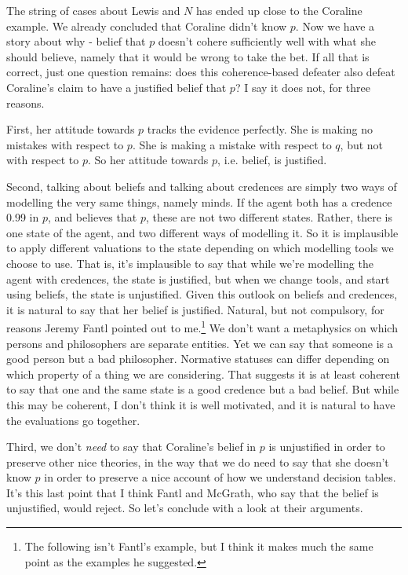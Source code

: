 \documentclass[11pt,oneside]{book}
\begin{document}
The string of cases about Lewis and $N$ has ended up close to the Coraline example. We already concluded that Coraline didn't know $p$. Now we have a story about why - belief that $p$ doesn't cohere sufficiently well with what she should believe, namely that it would be wrong to take the bet. If all that is correct, just one question remains: does this coherence-based defeater also defeat Coraline's claim to have a justified belief that $p$? I say it does not, for three reasons.

First, her attitude towards $p$ tracks the evidence perfectly. She is making no mistakes with respect to $p$. She is making a mistake with respect to $q$, but not with respect to $p$. So her attitude towards $p$, i.e. belief, is justified.

Second, talking about beliefs and talking about credences are simply two ways of modelling the very same things, namely minds. If the agent both has a credence 0.99 in $p$, and believes that $p$, these are not two different states. Rather, there is one state of the agent, and two different ways of modelling it. So it is implausible to apply different valuations to the state depending on which modelling tools we choose to use. That is, it's implausible to say that while we're modelling the agent with credences, the state is justified, but when we change tools, and start using beliefs, the state is unjustified. Given this outlook on beliefs and credences, it is natural to say that her belief is justified. Natural, but not compulsory, for reasons Jeremy Fantl pointed out to me.\footnote{The following isn't Fantl's example, but I think it makes much the same point as the examples he suggested.} We don't want a metaphysics on which persons and philosophers are separate entities. Yet we can say that someone is a good person but a bad philosopher. Normative statuses can differ depending on which property of a thing we are considering. That suggests it is at least coherent to say that one and the same state is a good credence but a bad belief. But while this may be coherent, I don't think it is well motivated, and it is natural to have the evaluations go together.

Third, we don't \textit{need} to say that Coraline's belief in $p$ is unjustified in order to preserve other nice theories, in the way that we do need to say that she doesn't know $p$ in order to preserve a nice account of how we understand decision tables. It's this last point that I think Fantl and McGrath, who say that the belief is unjustified, would reject. So let's conclude with a look at their arguments.
\end{document}
